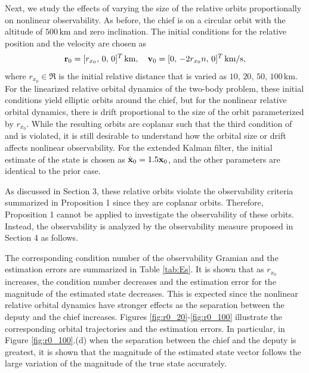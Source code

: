 Next, we study the effects of varying the size of the relative orbits proportionally on nonlinear observability. As before, the chief is on a circular orbit with the altitude of $500\,\mathrm{km}$ and zero inclination. The initial conditions for the relative position and the velocity are chosen as
\begin{gather*}
\mathbf{r}_0=[r_{x_0},\,0,\,0]^T\,\mathrm{km},\quad
\mathbf{v}_0=[0,\,-2r_{x_0}n,\,0]^T\,\mathrm{km/s},
\end{gather*}
where $r_{x_0}\in\Re$ is the initial relative distance that is varied as $10,\,20,\,50,\,100\,\mathrm{km}$. For the linearized relative orbital dynamics of the two-body problem, these initial conditions yield elliptic orbits around the chief, but for the nonlinear relative orbital dynamics, there is drift proportional to the size of the orbit parameterized by $r_{x_0}$. While the resulting orbits are coplanar such that the third condition of  and  is violated, it is still desirable to understand how the orbital size or drift affects nonlinear observability. For the extended Kalman filter, the initial estimate of the state is chosen as $\hat{\mathbf{x}}_0=1.5\mathbf{x}_0$, and the other parameters are identical to the prior case. 

As discussed in Section 3, these relative orbits violate the observability criteria summarized in Proposition 1 since they are coplanar orbits. Therefore, Proposition 1 cannot be applied to investigate the observability of these orbits. Instead, the observability is analyzed by the observability measure proposed in Section 4 as follows. 

The corresponding condition number of the observability Gramian and the estimation errors are summarized in Table \ref{tab:Es}. It is shown that as $r_{x_0}$ increases, the condition number decreases and the estimation error for the magnitude of the estimated state decreases. This is expected since the nonlinear relative orbital dynamics have stronger effects as the separation between the deputy and the chief increases. Figures \ref{fig:r0_20}-\ref{fig:r0_100} illustrate the corresponding orbital trajectories and the estimation errors. In particular, in Figure \ref{fig:r0_100}.(d) when the separation between the chief and the deputy is greatest, it is shown that the magnitude of the estimated state vector follows the large variation of the magnitude of the true state accurately.


